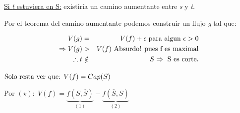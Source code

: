 \documentclass[12pt,a4paper]{report}
\begin{document}
					\vspace{3mm}
					\underline{Si \textit{t} estuviera en S:} existiría un camino aumentante entre \textit{s} y \textit{t}.
					\par Por el teorema del camino aumentante podemos construir un flujo \textit{g} tal que:

					\begin{eqnarray}
						\nonumber V(g) &=& V(f) + \epsilon \textup{ para algun } \epsilon > 0 \\
						\nonumber \Rightarrow V(g) &>& V(f) \textup{ Absurdo! pues f es maximal} \\
						\nonumber \therefore t &\notin & S \Rightarrow \textup{ S es corte.}
					\end{eqnarray}
					\par $\textup{Solo resta ver que: } V(f) = Cap(S)$
					\vspace{3mm}
					\par Por $(\star): \; V(f) =  \underbrace{f(S, \overline{S})}_{(1)} - \underbrace{f(\overline{S}, S)}_{(2)}$
\end{document}
